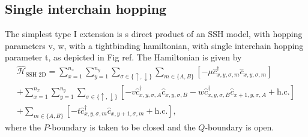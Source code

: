 \subsection{\label{ssec:single_interchain} Single interchain hopping}
The simplest type I extension is s direct product of an SSH model, with 
hopping parameters v, w, with a tightbinding hamiltonian, with single
interchain hopping parameter t, as depicted in Fig {\color{red}ref}. 
The Hamiltonian is given by
\begin{multline}
    \hat{\mathcal H}_\text{SSH 2D} =  
    \sum_{x=1}^{n_x}\sum_{y=1}^{n_y}\sum_{\sigma\in\{\uparrow,\downarrow\}} \sum_{m\in\{A,B\}} 
    \left[
-\mu \hat c_{x, y, \sigma, m}^\dagger \hat c_{x, y, \sigma, m}
\right]\\
+
    \sum_{x=1}^{n_x}\sum_{y=1}^{n_y} \sum_{\sigma\in\{\uparrow,\downarrow\}}
    \left[
    -v \hat c_{x, y, \sigma, A}^\dagger \hat c_{x, y, \sigma, B}
    -w \hat c_{x, y, \sigma, B}^\dagger \hat c_{x+1, y, \sigma, A}
    +\text{h.c.}
\right]\\
+
\sum_{m\in\{A,B\}}
    \left[
    -t \hat c_{x, y, \sigma, m}^\dagger \hat c_{x, y+1, \sigma, m}
    +\text{h.c.}
\right],
\label{eq:single_type_I}
\end{multline}
where the $P$-boundary is taken to be closed and the $Q$-boundary is open.


